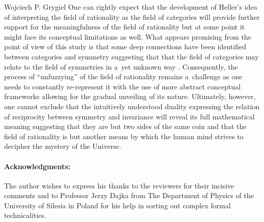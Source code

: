 \begin{artengenv}{Wojciech P. Grygiel}
One can rightly expect that the development of Heller's idea of interpreting the field of rationality as the field of categories will provide further support for the meaningfulness of the field of rationality but at some point it might face its conceptual limitations as well. What appears promising from the point of view of this study is that some deep connections have been identified between categories and symmetry suggesting that that the field of categories may relate to the field of symmetries in a~yet unknown way 
\parencite[e.g.,][]{heunen_principle_2008}. %
 Consequently, the process of ``unfuzzying'' of the field of rationality remains a~challenge as one needs to constantly re-represent it with the use of more abstract conceptual frameworks allowing for the gradual unveiling of its nature. Ultimately, however, one cannot exclude that the intuitively understood duality expressing the relation of reciprocity between symmetry and invariance will reveal its full mathematical meaning suggesting that they are but two sides of the same coin and that the field of rationality is but another means by which the human mind strives to decipher the mystery of the Universe.


\enlargethispage{1.5\baselineskip}
\paragraph{Acknowledgments:}
The author wishes to express his thanks to the reviewers for their incisive comments and to Professor Jerzy Dajka from The Department of Physics of the University of Silesia in Poland for his help in sorting out complex formal technicalities.



\end{artengenv}
